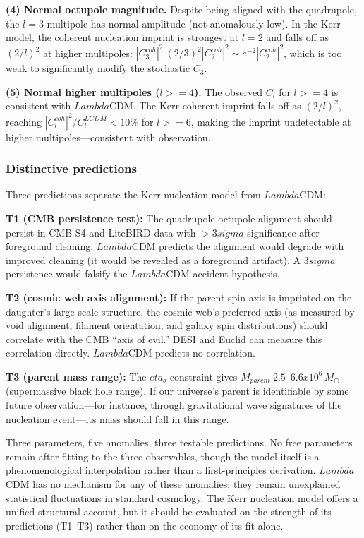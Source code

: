 \documentclass[11pt]{article}
\def\ell{l}%
\def\Lambda{Lambda}%
\def\sigma{sigma}%
\def\eta{eta}%
\def\mathrm#1{#1}%
\def\times{x}%
\def\geq{>=}%
\def\approx{~}%
\begin{document}
\textbf{(4) Normal octupole magnitude.} Despite being aligned with the quadrupole, the $\ell = 3$ multipole has normal amplitude (not anomalously low). In the Kerr model, the coherent nucleation imprint is strongest at $\ell = 2$ and falls off as $(2/\ell)^2$ at higher multipoles: $|C_3^{\mathrm{coh}}|^2 \approx (2/3)^2 |C_2^{\mathrm{coh}}|^2 \sim e^{-2}|C_2^{\mathrm{coh}}|^2$, which is too weak to significantly modify the stochastic $C_3$.

\textbf{(5) Normal higher multipoles ($\ell \geq 4$).} The observed $C_\ell$ for $\ell \geq 4$ is consistent with $\Lambda$CDM. The Kerr coherent imprint falls off as $(2/\ell)^2$, reaching $|C_\ell^{\mathrm{coh}}|^2/C_\ell^{\mathrm{LCDM}} < 10\%$ for $\ell \geq 6$, making the imprint undetectable at higher multipoles---consistent with observation.

\subsubsection{Distinctive predictions}

Three predictions separate the Kerr nucleation model from $\Lambda$CDM:

\textbf{T1 (CMB persistence test):} The quadrupole-octupole alignment should persist in CMB-S4 and LiteBIRD data with $> 3\sigma$ significance after foreground cleaning. $\Lambda$CDM predicts the alignment would degrade with improved cleaning (it would be revealed as a foreground artifact). A $3\sigma$ persistence would falsify the $\Lambda$CDM accident hypothesis.

\textbf{T2 (cosmic web axis alignment):} If the parent spin axis is imprinted on the daughter's large-scale structure, the cosmic web's preferred axis (as measured by void alignment, filament orientation, and galaxy spin distributions) should correlate with the CMB ``axis of evil.'' DESI and Euclid can measure this correlation directly. $\Lambda$CDM predicts no correlation.

\textbf{T3 (parent mass range):} The $\eta_b$ constraint gives $M_{\mathrm{parent}} \approx 2.5$--$6.6 \times 10^6\,M_\odot$ (supermassive black hole range). If our universe's parent is identifiable by some future observation---for instance, through gravitational wave signatures of the nucleation event---its mass should fall in this range.

Three parameters, five anomalies, three testable predictions. No free parameters remain after fitting to the three observables, though the model itself is a phenomenological interpolation rather than a first-principles derivation. $\Lambda$CDM has no mechanism for any of these anomalies; they remain unexplained statistical fluctuations in standard cosmology. The Kerr nucleation model offers a unified structural account, but it should be evaluated on the strength of its predictions (T1--T3) rather than on the economy of its fit alone.
\end{document}
